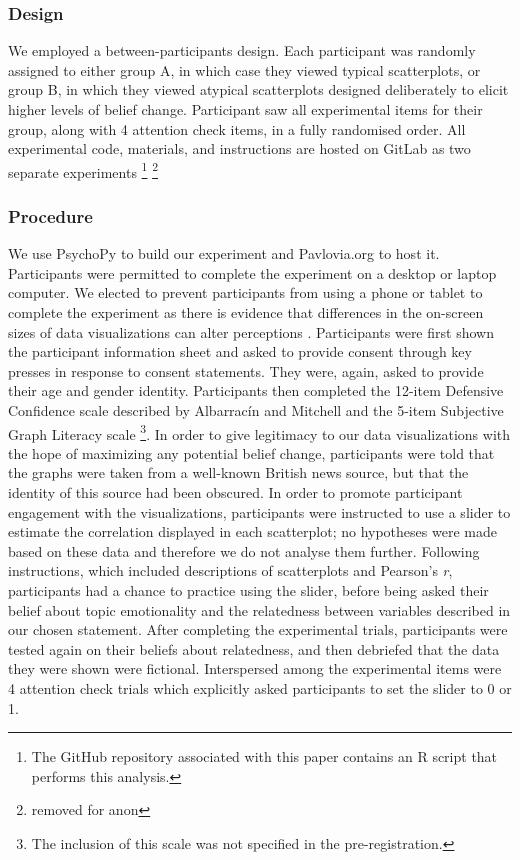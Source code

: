 \documentclass[manuscript,screen,review]{acmart}
\begin{document}
\subsubsection{Design}\label{sec-design-main}

We employed a between-participants design. Each participant was randomly
assigned to either group A, in which case they viewed typical
scatterplots, or group B, in which they viewed atypical scatterplots
designed deliberately to elicit higher levels of belief change.
Participant saw all experimental items for their group, along with 4
attention check items, in a fully randomised order. All experimental
code, materials, and instructions are hosted on GitLab as two separate
experiments \footnote{The GitHub repository associated with this paper
  contains an R script that performs this analysis.} \footnote{removed
  for anon}

\subsubsection{Procedure}\label{sec-procedure-main}

We use PsychoPy \citep{pierce_2019} to build our experiment and
Pavlovia.org to host it. Participants were permitted to complete the
experiment on a desktop or laptop computer. We elected to prevent
participants from using a phone or tablet to complete the experiment as
there is evidence that differences in the on-screen sizes of data
visualizations can alter perceptions \citep{cleveland_1982}.
Participants were first shown the participant information sheet and
asked to provide consent through key presses in response to consent
statements. They were, again, asked to provide their age and gender
identity. Participants then completed the 12-item Defensive Confidence
scale described by Albarracín and Mitchell \citep{albarracin_2004} and
the 5-item Subjective Graph Literacy scale \citep{garcia_2016}
\footnote{The inclusion of this scale was not specified in the
  pre-registration.}. In order to give legitimacy to our data
visualizations with the hope of maximizing any potential belief change,
participants were told that the graphs were taken from a well-known
British news source, but that the identity of this source had been
obscured. In order to promote participant engagement with the
visualizations, participants were instructed to use a slider to estimate
the correlation displayed in each scatterplot; no hypotheses were made
based on these data and therefore we do not analyse them further.
Following instructions, which included descriptions of scatterplots and
Pearson's \emph{r}, participants had a chance to practice using the
slider, before being asked their belief about topic emotionality and the
relatedness between variables described in our chosen statement. After
completing the experimental trials, participants were tested again on
their beliefs about relatedness, and then debriefed that the data they
were shown were fictional. Interspersed among the experimental items
were 4 attention check trials which explicitly asked participants to set
the slider to 0 or 1.
\end{document}
